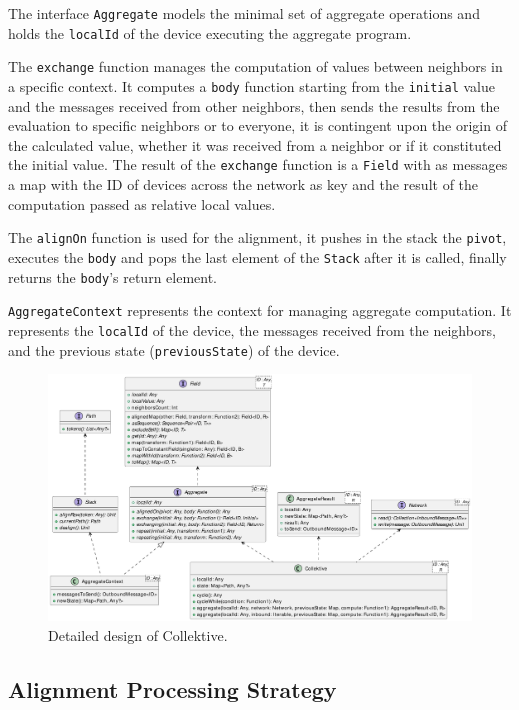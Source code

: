 The interface \texttt{Aggregate} models the minimal set of aggregate operations and holds the \texttt{localId} of the device executing the aggregate program.

The \texttt{exchange} function manages the computation of values between neighbors in a specific context. It computes a \texttt{body} function starting from the \texttt{initial} value and the messages received from other neighbors, then sends the results from the evaluation to specific neighbors or to everyone, it is contingent upon the origin of the calculated value, whether it was received from a neighbor or if it constituted the initial value. The result of the \texttt{exchange} function is a \texttt{Field} with as messages a map with the ID of devices across the network as key and the result of the computation passed as relative local values.

The \texttt{alignOn} function is used for the alignment, it pushes in the stack the \texttt{pivot}, executes the \texttt{body} and pops the last element of the \texttt{Stack} after it is called, finally returns the \texttt{body}'s return element.

\texttt{AggregateContext} represents the context for managing aggregate computation. It represents the \texttt{localId} of the device, the messages received from the neighbors, and the previous state (\texttt{previousState}) of the device.

\begin{figure}
    \centering
    \includegraphics[width=\linewidth,angle=90]{figures/collektive-design.pdf}
    \caption{Detailed design of Collektive.}
    \label{fig:collektive-design}
\end{figure}

\subsection{Alignment Processing Strategy}

